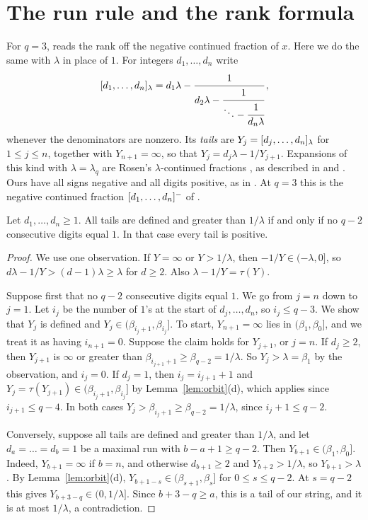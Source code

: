 \section{The run rule and the rank formula}\label{sec:words}

For $q=3$, \cite[Section~4]{P137} reads the rank off the negative continued fraction of $x$. Here we
do the same with $\lambda$ in place of $1$. For integers $d_1,\dots,d_n$ write
\[
[d_1,\dots,d_n]_{\lambda}=d_1\lambda-\cfrac{1}{d_2\lambda-\cfrac{1}{\ddots-\cfrac{1}{d_n\lambda}}}\,,
\]
whenever the denominators are nonzero. Its \emph{tails} are $Y_j=[d_j,\dots,d_n]_{\lambda}$ for
$1\le j\le n$, together with $Y_{n+1}=\infty$, so that $Y_j=d_j\lambda-1/Y_{j+1}$. Expansions of this
kind with $\lambda=\lambda_q$ are Rosen's $\lambda$-continued fractions \cite{rosen1954}, as
described in \cite[Section~1.2]{rosen-schmidt} and \cite{short-walker}. Ours have
all signs negative and all digits positive, as in \cite{jrr}. At $q=3$ this is the negative continued
fraction $[d_1,\dots,d_n]^{-}$ of \cite{P137}.

\begin{lemma}\label{lem:tails}
Let $d_1,\dots,d_n\ge1$. All tails are defined and greater than $1/\lambda$ if and only if no $q-2$
consecutive digits equal $1$. In that case every tail is positive.
\end{lemma}

\begin{proof}
We use one observation. If $Y=\infty$ or $Y>1/\lambda$, then $-1/Y\in(-\lambda,0]$, so
$d\lambda-1/Y>(d-1)\lambda\ge\lambda$ for $d\ge2$. Also $\lambda-1/Y=\tau(Y)$.

Suppose first that no $q-2$ consecutive digits equal $1$. We go from $j=n$ down to $j=1$. Let $i_j$ be
the number of $1$'s at the start of $d_j,\dots,d_n$, so $i_j\le q-3$. We show that $Y_j$ is defined and
$Y_j\in(\beta_{i_j+1},\beta_{i_j}]$. To start, $Y_{n+1}=\infty$ lies in $(\beta_1,\beta_0]$, and we
treat it as having $i_{n+1}=0$. Suppose the claim holds for $Y_{j+1}$, or $j=n$. If $d_j\ge2$, then
$Y_{j+1}$ is $\infty$ or greater than $\beta_{i_{j+1}+1}\ge\beta_{q-2}=1/\lambda$. So $Y_j>\lambda=\beta_1$
by the observation, and $i_j=0$. If $d_j=1$, then $i_j=i_{j+1}+1$
and $Y_j=\tau(Y_{j+1})\in(\beta_{i_j+1},\beta_{i_j}]$ by Lemma~\ref{lem:orbit}(d), which applies since
$i_{j+1}\le q-4$. In both cases $Y_j>\beta_{i_j+1}\ge\beta_{q-2}=1/\lambda$, since $i_j+1\le q-2$.

Conversely, suppose all tails are defined and greater than $1/\lambda$, and let $d_a=\dots=d_b=1$ be a
maximal run with $b-a+1\ge q-2$. Then $Y_{b+1}\in(\beta_1,\beta_0]$. Indeed, $Y_{b+1}=\infty$ if
$b=n$, and otherwise $d_{b+1}\ge2$ and $Y_{b+2}>1/\lambda$, so $Y_{b+1}>\lambda$. By
Lemma~\ref{lem:orbit}(d), $Y_{b+1-s}\in(\beta_{s+1},\beta_s]$ for $0\le s\le q-2$. At $s=q-2$ this
gives $Y_{b+3-q}\in(0,1/\lambda]$. Since $b+3-q\ge a$, this is a tail of our string, and it is at most
$1/\lambda$, a contradiction.
\end{proof}

